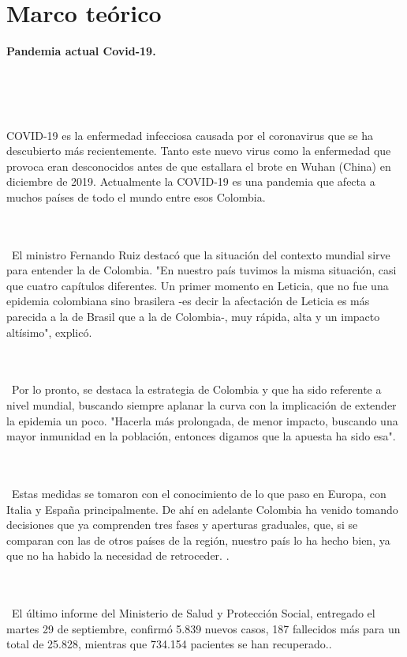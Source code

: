 \documentclass[conference,compsoc,onecolumn]{IEEEtran}
\begin{document}
\section{Marco teórico}
\label{sec:introduction}

\textbf{Pandemia actual Covid-19.}
\\\

\justify
\\\

COVID‑19 es la enfermedad infecciosa causada por el coronavirus que se ha descubierto más recientemente. Tanto este nuevo virus como la enfermedad que provoca eran desconocidos antes de que estallara el brote en Wuhan (China) en diciembre de 2019. Actualmente la COVID‑19 es una pandemia que afecta a muchos países de todo el mundo entre esos Colombia.
\\\

\justify
\\\
El ministro Fernando Ruiz destacó que la situación del contexto mundial sirve para entender la de Colombia. "En nuestro país tuvimos la misma situación, casi que cuatro capítulos diferentes. Un primer momento en Leticia, que no fue una epidemia colombiana sino brasilera -es decir la afectación de Leticia es más parecida a la de Brasil que a la de Colombia-, muy rápida, alta y un impacto altísimo", explicó.
\\\

\justify
\\\
Por lo pronto, se destaca la estrategia de Colombia y que ha sido referente a nivel mundial, buscando siempre aplanar la curva con la implicación de extender la epidemia un poco. "Hacerla más prolongada, de menor impacto, buscando una mayor inmunidad en la población, entonces digamos que la apuesta ha sido esa".
\\\

\justify
\\\
Estas medidas se tomaron con el conocimiento de lo que paso en Europa, con Italia y España principalmente. De ahí en adelante Colombia ha venido tomando decisiones que ya comprenden tres fases y aperturas graduales, que, si se comparan con las de otros países de la región, nuestro país lo ha hecho bien, ya que no ha habido la necesidad de retroceder. .~\cite{1}
\\\

\justify
\\\
El último informe del Ministerio de Salud y Protección Social, entregado el martes 29 de septiembre, confirmó 5.839 nuevos casos, 187 fallecidos más para un total de 25.828, mientras que 734.154 pacientes se han recuperado..~\cite{2}
\\\
\end{document}
